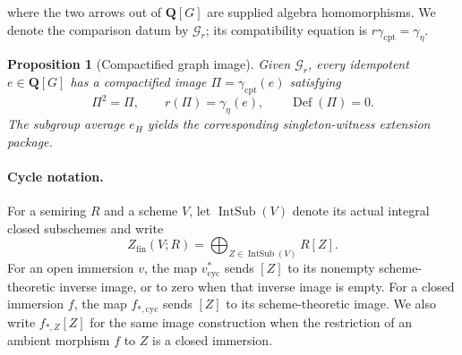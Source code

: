 \documentclass[11pt]{article}
\newtheorem{proposition}[theorem]{Proposition}
\theoremstyle{definition}
\theoremstyle{remark}
\DeclareMathOperator{\Def}{Def}
\newcommand{\Q}{\mathbf Q}
\begin{document}
where the two arrows out of \(\Q[G]\) are supplied algebra homomorphisms.  We
denote the comparison datum by \(\mathscr G_r\); its compatibility equation is
\(r\gamma_{\mathrm{cpt}}=\gamma_\eta\).

\begin{proposition}[Compactified graph image]
\label{prop:graph-route}
Given \(\mathscr G_r\), every idempotent \(e\in\Q[G]\) has a compactified
image
\(\Pi=\gamma_{\mathrm{cpt}}(e)\) satisfying
\[
  \Pi^2=\Pi,
  \qquad r(\Pi)=\gamma_\eta(e),
  \qquad \Def(\Pi)=0.
\]
The subgroup average \(e_H\) yields the corresponding singleton-witness
extension package.
\end{proposition}

\paragraph{Cycle notation.}
For a semiring \(R\) and a scheme \(V\), let \(\operatorname{IntSub}(V)\) denote its
actual integral closed subschemes and write
\[
  Z_{\mathrm{fin}}(V;R)
    =\bigoplus_{Z\in\operatorname{IntSub}(V)}R[Z].
\]
For an open immersion \(v\), the map \(v^*_{\mathrm{cyc}}\) sends
\([Z]\) to its nonempty scheme-theoretic inverse image, or to zero
when that inverse image is empty. For a closed immersion \(f\), the
map \(f_{*,\mathrm{cyc}}\) sends \([Z]\) to its scheme-theoretic
image. We also write \(f_{*,Z}[Z]\) for the same image construction
when the restriction of an ambient morphism \(f\) to \(Z\) is a
closed immersion.
\end{document}
